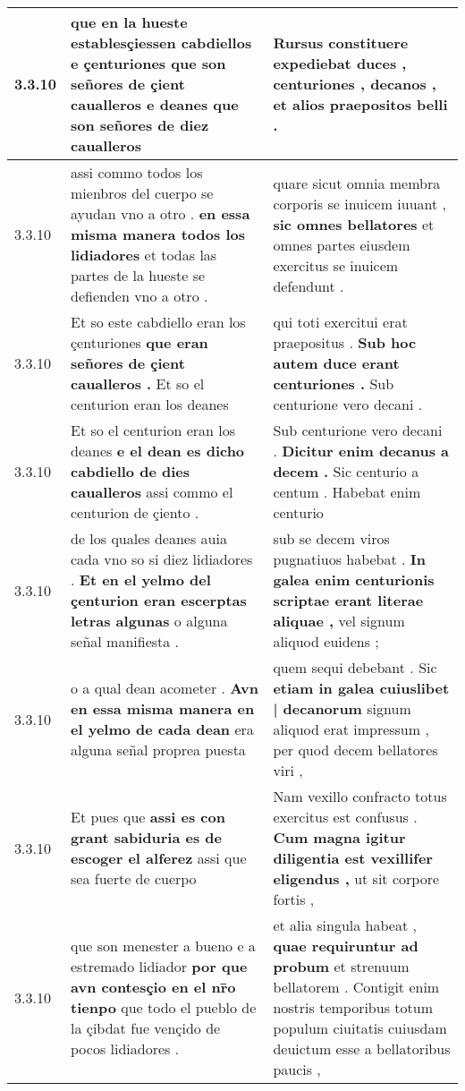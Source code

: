 \begin{tabular}{|p{1cm}|p{6.5cm}|p{6.5cm}|}
3.3.10 & que en la hueste establesçiessen cabdiellos e çenturiones \textbf{ que son señores de çient caualleros e deanes } que son señores de diez caualleros & Rursus constituere expediebat duces , \textbf{ centuriones , decanos , } et alios praepositos belli . \\\hline
3.3.10 & assi commo todos los mienbros del cuerpo se ayudan vno a otro . \textbf{ en essa misma manera todos los lidiadores } et todas las partes de la hueste se defienden vno a otro . & quare sicut omnia membra corporis se inuicem iuuant , \textbf{ sic omnes bellatores } et omnes partes eiusdem exercitus se inuicem defendunt . \\\hline
3.3.10 & Et so este cabdiello eran los çenturiones \textbf{ que eran señores de çient caualleros . } Et so el centurion eran los deanes & qui toti exercitui erat praepositus . \textbf{ Sub hoc autem duce erant centuriones . } Sub centurione vero decani . \\\hline
3.3.10 & Et so el centurion eran los deanes \textbf{ e el dean es dicho cabdiello de dies caualleros } assi commo el centurion de çiento . & Sub centurione vero decani . \textbf{ Dicitur enim decanus a decem . } Sic centurio a centum . Habebat enim centurio \\\hline
3.3.10 & de los quales deanes auia cada vno so si diez lidiadores . \textbf{ Et en el yelmo del çenturion eran escerptas letras algunas } o alguna señal manifiesta . & sub se decem viros pugnatiuos habebat . \textbf{ In galea enim centurionis scriptae erant literae aliquae , } vel signum aliquod euidens ; \\\hline
3.3.10 & o a qual dean acometer . \textbf{ Avn en essa misma manera en el yelmo de cada dean } era alguna señal proprea puesta & quem sequi debebant . Sic \textbf{ etiam in galea cuiuslibet | decanorum } signum aliquod erat impressum , per quod decem bellatores viri , \\\hline
3.3.10 & Et pues que \textbf{ assi es con grant sabiduria es de escoger el alferez } assi que sea fuerte de cuerpo & Nam vexillo confracto totus exercitus est confusus . \textbf{ Cum magna igitur diligentia est vexillifer eligendus , } ut sit corpore fortis , \\\hline
3.3.10 & que son menester a bueno e a estremado lidiador \textbf{ por que avn contesçio en el nr̄o tienpo } que todo el pueblo de la çibdat fue vençido de pocos lidiadores . & et alia singula habeat , \textbf{ quae requiruntur ad probum } et strenuum bellatorem . Contigit enim nostris temporibus totum populum ciuitatis cuiusdam deuictum esse a bellatoribus paucis , \\\hline

\end{tabular}
